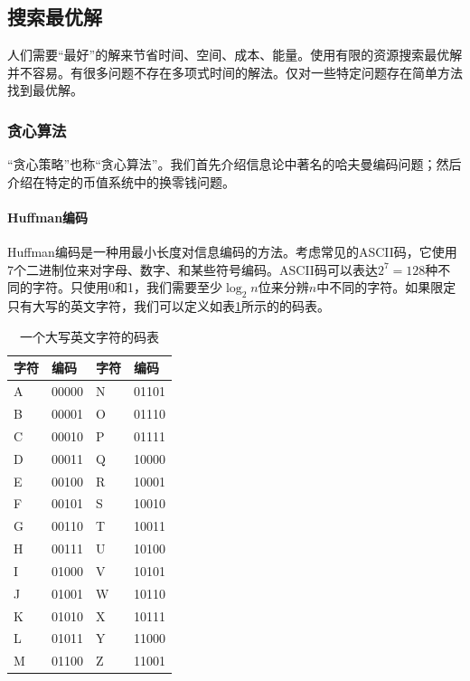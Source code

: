 \documentclass[b5paper]{ctexart}
\begin{document}
\subsection{搜索最优解}

人们需要“最好”的解来节省时间、空间、成本、能量。使用有限的资源搜索最优解并不容易。有很多问题不存在多项式时间的解法。仅对一些特定问题存在简单方法找到最优解。

\subsubsection{贪心算法}

“贪心策略”也称“贪心算法”。我们首先介绍信息论中著名的哈夫曼编码问题；然后介绍在特定的币值系统中的换零钱问题。

\paragraph{Huffman编码}

Huffman编码是一种用最小长度对信息编码的方法。考虑常见的ASCII码，它使用7个二进制位来对字母、数字、和某些符号编码。ASCII码可以表达$2^7 = 128$种不同的字符。只使用0和1，我们需要至少$\log_2 n$位来分辨$n$中不同的字符。如果限定只有大写的英文字符，我们可以定义如表\ref{tab:example-codetable}所示的的码表。

\begin{table}[htbp]
\centering
\begin{tabular}{l|l||l|l}
字符 & 编码 & 字符 & 编码 \\
\hline
A & 00000 & N & 01101 \\
B & 00001 & O & 01110 \\
C & 00010 & P & 01111 \\
D & 00011 & Q & 10000 \\
E & 00100 & R & 10001 \\
F & 00101 & S & 10010 \\
G & 00110 & T & 10011 \\
H & 00111 & U & 10100 \\
I & 01000 & V & 10101 \\
J & 01001 & W & 10110 \\
K & 01010 & X & 10111 \\
L & 01011 & Y & 11000 \\
M & 01100 & Z & 11001 \\
\hline
\end{tabular}
\caption{一个大写英文字符的码表} \label{tab:example-codetable}
\end{table}
\end{document}
